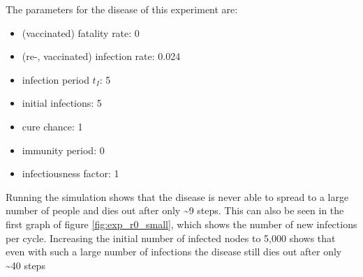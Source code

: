 The parameters for the disease of this experiment are:
\begin{itemize}
    \item (vaccinated) fatality rate: 0
    \item (re-, vaccinated) infection rate: 0.024
    \item infection period $t_I$: 5
    \item initial infections: 5
    \item cure chance: 1
    \item immunity period: 0
    \item infectiousness factor: 1
\end{itemize}

Running the simulation shows that the disease is never able to spread to a large number of people and dies out after only \textasciitilde 9 steps. This can also be seen in the first graph of figure \ref{fig:exp_r0_small}, which shows the number of new infections per cycle. Increasing the initial number of infected nodes to 5,000 shows that even with such a large number of infections the disease still dies out after only \textasciitilde 40 steps



